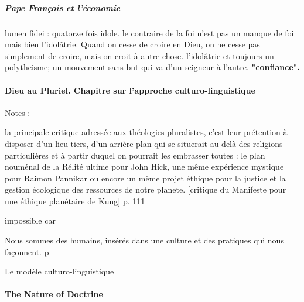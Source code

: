 \subparagraph{Pape François et l'économie}
lumen fidei : quatorze fois idole. le contraire de la foi n'est pas un manque de foi mais bien l'idolâtrie. Quand on cesse de croire en Dieu, on ne cesse pas simplement de croire, mais on croit à autre chose.  l'idolâtrie et toujours un polytheisme; un mouvement sans but qui va d'un seigneur à l'autre. \textbf{"confiance".}
\begin{singlequote}

\end{singlequote}



\paragraph{Dieu au Pluriel.  Chapitre sur l'approche culturo-linguistique}    
        \cite{cheno_dieu_2017}

    Notes :
\begin{singlequote}
        
        la principale critique adressée aux théologies pluralistes, c’est leur prétention à disposer d’un lieu tiers, d’un arrière-plan qui se situerait au delà des religions particulières et à partir duquel on pourrait les embrasser toutes : le plan nouménal de la Rélité ultime pour John Hick, une même expérience mystique pour Raimon Pannikar ou encore un même projet éthique pour la justice et la gestion écologique des ressources de notre planete. [critique du Manifeste pour une éthique planétaire de Kung] p. 111
\end{singlequote}

        impossible car
\begin{singlequote}
        Nous sommes des humains, insérés dans une culture et des pratiques qui nous façonnent. p

\end{singlequote}

        Le modèle culturo-linguistique
\paragraph{The Nature of Doctrine} \cite{lindbeck_nature_2002}

    
